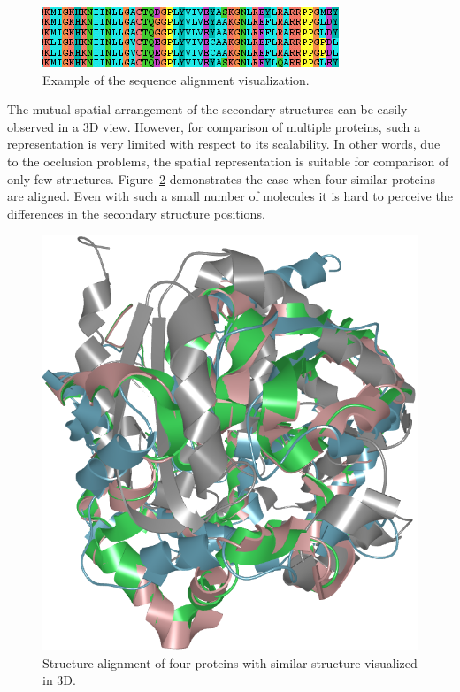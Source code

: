 \documentclass[twocolumn]{bmcart}%
\begin{document}
\begin{figure}[th]
  \centering
  \includegraphics[width=0.9\columnwidth]{pics/align.png}
  \caption{Example of the sequence alignment visualization.}
  \label{fig:align}
\end{figure}

The mutual spatial arrangement of the secondary structures can be easily observed in a 3D view. 
However, for comparison of multiple proteins, such a representation is very limited with respect to its scalability.
In other words, due to the occlusion problems, the spatial representation is suitable for comparison of only few structures. 
Figure~\ref{fig:many} demonstrates the case when four similar proteins are aligned.
Even with such a small number of molecules it is hard to perceive the differences in the secondary structure positions.


\begin{figure}[th]
  \centering
  \includegraphics[width=0.9\columnwidth]{pics/many.png}
  \caption{Structure alignment of four proteins with similar structure visualized in 3D.}
  \label{fig:many}
\end{figure}
\end{document}
